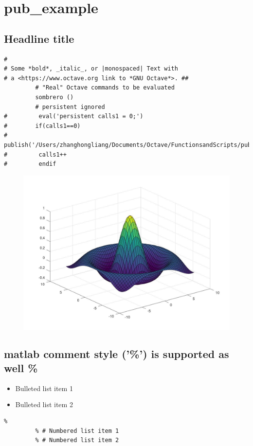 \documentclass[10pt]{article}
\begin{document}
{\Huge\section*{pub\_example}}

\tableofcontents
\vspace*{4em}



{}
\subsection*{Headline title}

\begin{lstlisting}
#
# Some *bold*, _italic_, or |monospaced| Text with
# a <https://www.octave.org link to *GNU Octave*>. ##
         # "Real" Octave commands to be evaluated
         sombrero ()
         # persistent ignored
#         eval('persistent calls1 = 0;')
#        if(calls1==0)
#         publish('/Users/zhanghongliang/Documents/Octave/FunctionsandScripts/pub_example.m')
#         calls1++
#         endif
\end{lstlisting}
\begin{figure}[!ht]
\includegraphics[width=\textwidth]{pub_example-1.jpg}
\end{figure}


{}
\subsection*{matlab comment style ('\%') is supported as well \%}


\begin{itemize}
\item Bulleted list item 1
\item Bulleted list item 2
\end{itemize}
\begin{lstlisting}
%
         % # Numbered list item 1
         % # Numbered list item 2
\end{lstlisting}
\end{document}
